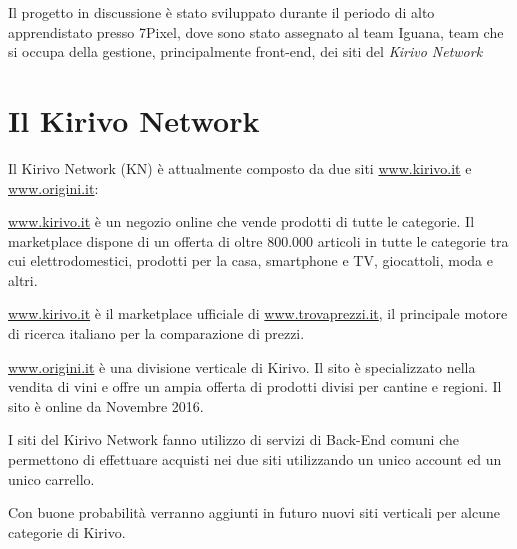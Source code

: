 


Il progetto in discussione è stato sviluppato durante il periodo di  alto apprendistato presso 7Pixel,
dove sono stato assegnato al team Iguana, team che si occupa
della gestione, principalmente front-end, dei siti del \emph{Kirivo Network}

\section{Il Kirivo Network}
Il Kirivo Network (KN) è attualmente composto da due siti  \url{www.kirivo.it} 
e \url{www.origini.it}:

\url{www.kirivo.it} è un negozio online che vende prodotti di tutte le categorie.
Il marketplace dispone di un offerta di oltre 800.000 articoli in tutte le categorie tra cui
elettrodomestici, prodotti per la casa, smartphone e TV, giocattoli, moda e altri.

\url{www.kirivo.it} è il marketplace ufficiale di \url{www.trovaprezzi.it}, il principale motore
di ricerca italiano per la comparazione di prezzi.

\url{www.origini.it} è una divisione verticale di Kirivo. Il sito è specializzato nella vendita
di vini e offre un ampia offerta di prodotti divisi per cantine e regioni. Il sito
è online da Novembre 2016.

I siti del Kirivo Network fanno utilizzo di servizi di Back-End comuni che permettono 
di effettuare acquisti nei due siti utilizzando un unico account ed un unico carrello.

Con buone probabilità verranno aggiunti in futuro nuovi siti verticali per alcune categorie
di Kirivo.

